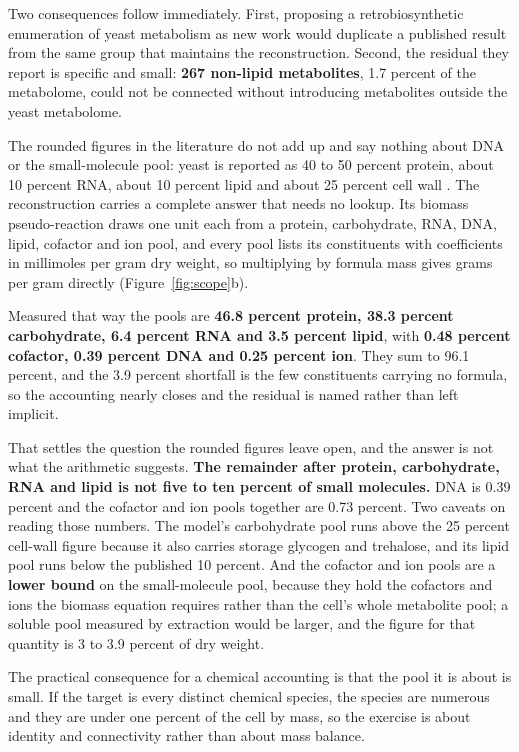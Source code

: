 Two consequences follow immediately. First, proposing a retrobiosynthetic enumeration of yeast
metabolism as new work would duplicate a published result from the same group that maintains
the reconstruction. Second, the residual they report is specific and small: \textbf{267
non-lipid metabolites}, 1.7 percent of the metabolome, could not be connected without
introducing metabolites outside the yeast metabolome.

The rounded figures in the literature do not add up and say nothing about DNA or the
small-molecule pool: yeast is reported as 40 to 50 percent protein, about 10 percent RNA,
about 10 percent lipid and about 25 percent cell wall . The reconstruction carries a complete answer that needs no lookup. Its biomass
pseudo-reaction draws one unit each from a protein, carbohydrate, RNA, DNA, lipid, cofactor and
ion pool, and every pool lists its constituents with coefficients in millimoles per gram dry
weight, so multiplying by formula mass gives grams per gram directly
(Figure~\ref{fig:scope}b).

Measured that way the pools are \textbf{46.8 percent protein, 38.3 percent carbohydrate, 6.4
percent RNA and 3.5 percent lipid}, with \textbf{0.48 percent cofactor, 0.39 percent DNA and
0.25 percent ion}. They sum to 96.1 percent, and the 3.9 percent shortfall is the few
constituents carrying no formula, so the accounting nearly closes and the residual is named
rather than left implicit.

That settles the question the rounded figures leave open, and the answer is not what the
arithmetic suggests. \textbf{The remainder after protein, carbohydrate, RNA and lipid is not
five to ten percent of small molecules.} DNA is 0.39 percent and the cofactor and ion pools
together are 0.73 percent. Two caveats on reading those numbers. The model's carbohydrate pool
runs above the 25 percent cell-wall figure because it also carries storage glycogen and
trehalose, and its lipid pool runs below the published 10 percent. And the cofactor and ion
pools are a \textbf{lower bound} on the small-molecule pool, because they hold the cofactors
and ions the biomass equation requires rather than the cell's whole metabolite pool; a soluble
pool measured by extraction would be larger, and the  figure for that quantity is
3 to 3.9 percent of dry weight.

The practical consequence for a chemical accounting is that the pool it is about is small. If
the target is every distinct chemical species, the species are numerous and they are under one
percent of the cell by mass, so the exercise is about identity and connectivity rather than
about mass balance.
